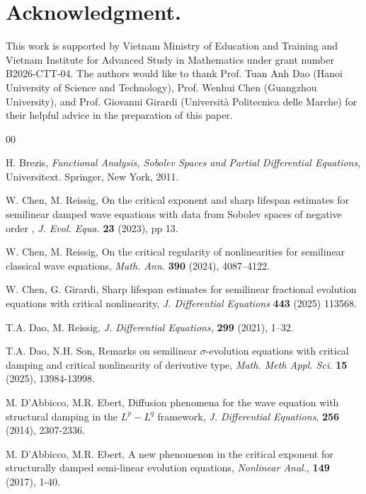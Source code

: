 \documentclass[11pt,reqno]{amsart}
\begin{document}
\section*{Acknowledgment.}
This work is supported by Vietnam Ministry of Education and Training
and Vietnam Institute for Advanced Study in Mathematics under grant number B2026-CTT-04.  The authors would like to thank Prof. Tuan Anh Dao (Hanoi University of Science
and Technology), Prof. Wenhui Chen (Guangzhou University), and Prof. Giovanni Girardi (Università Politecnica delle Marche) for their helpful advice in the preparation of this
paper.
\begin{thebibliography}{00}
 

 H. Brezis, \textit{Functional Analysis, Sobolev Spaces and Partial Differential Equations}, Universitext. Springer, New York, 2011.

 W. Chen, M. Reissig, On the critical exponent and sharp lifespan estimates for semilinear damped wave equations with data from Sobolev spaces of negative order , \textit{J. Evol. Equa. } \textbf{23} (2023), pp 13.

 W. Chen, M. Reissig, On the critical regularity of nonlinearities for semilinear classical wave equations, \textit{Math. Ann.} \textbf{390} (2024), 4087–4122.

 W. Chen, G. Girardi, Sharp lifespan estimates for semilinear fractional evolution equations with critical nonlinearity, \textit{J. Differential Equations} \textbf{443}        (2025) 113568. 

 T.A. Dao, M. Reissig,  \textit{J. Differential Equations, } \textbf{299} (2021), 1–32.

 T.A.   Dao, N.H. Son, Remarks on semilinear $\sigma$-evolution equations with critical
damping and critical nonlinearity of derivative type, \textit{Math. Meth Appl. Sci. } \textbf{15}        (2025), 13984-13998. 
 

  M. D'Abbicco, M.R. Ebert, Diffusion phenomena for the wave equation with structural damping in the $L^p-L^q$ framework, \textit{J. Differential Equations}, \textbf{256} (2014), 2307-2336.

 M. D'Abbicco, M.R. Ebert, A new phenomenon in the critical exponent for structurally damped semi-linear evolution equations, \textit{Nonlinear Anal.}, \textbf{149} (2017), 1-40.





\end{thebibliography}
\end{document}
